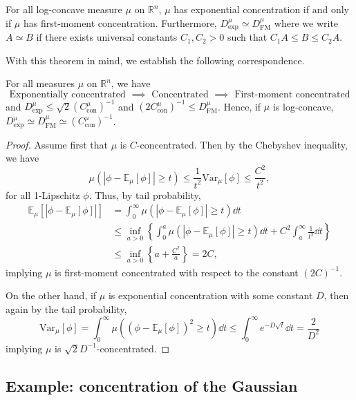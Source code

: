 \begin{theorem}\label{thm:milman}
  For all log-concave measure \(\mu\) on \(\mathbb{R}^n\), \(\mu\) has exponential concentration 
  if and only if \(\mu\) has first-moment concentration. Furthermore, 
  \(D^\mu_{\text{exp}} \simeq D^\mu_{\text{FM}}\) where we write \(A \simeq B\) if there exists 
  universal constants \(C_1, C_2 > 0\) such that \(C_1 A \le B \le C_2 A\).
\end{theorem}

With this theorem in mind, we establish the following correspondence.

\begin{proposition}\label{thm:equiv}
  For all measures \(\mu\) on \(\mathbb{R}^n\), we have 
  \[\text{Exponentially concentrated \(\implies\) Concentrated \(\implies\) First-moment concentrated}\]
  and \(D^\mu_{\text{exp}} \le \sqrt{2} (C^\mu_{\text{con}})^{-1}\) and 
  \((2C^\mu_{\text{con}})^{-1} \le D^\mu_{\text{FM}}\).
  Hence, if \(\mu\) is log-concave, 
  \(D^\mu_{\text{exp}} \simeq D^\mu_{\text{FM}} \simeq (C^\mu_{\text{con}})^{-1}\).
\end{proposition}
\begin{proof}
  Assume first that \(\mu\) is \(C\)-concentrated. Then by the Chebyshev inequality, we have 
  \[\mu(|\phi - \mathbb{E}_\mu[\phi]| \ge t) 
      \le \frac{1}{t^2}\text{Var}_\mu[\phi] 
      \le \frac{C^2}{t^2},\]
  for all 1-Lipschitz \(\phi\). 
  Thus, by tail probability,
  \begin{align*}\mathbb{E}_\mu[|\phi - \mathbb{E}_\mu[\phi]|] 
    & = \int_0^\infty \mu(|\phi - \mathbb{E}_\mu[\phi]| \ge t) \dd t\\ 
    & \le \inf_{a > 0} \left\{\int_0^a \mu(|\phi - \mathbb{E}_\mu[\phi]| \ge t) \dd t + C^2 \int_a^\infty \frac{1}{t^2} \dd t\right\}\\ 
    & \le \inf_{a > 0} \left\{a + \frac{C^2}{a}\right\} = 2C,
  \end{align*}
  implying \(\mu\) is first-moment concentrated with respect to the constant \((2C)^{-1}\).

  On the other hand, if \(\mu\) is exponential concentration with some constant \(D\), then 
  again by the tail probability, 
  \[\text{Var}_\mu[\phi] = \int_0^\infty \mu((\phi - \mathbb{E}_\mu[\phi])^2 \ge t) \dd t
      \le \int_0^\infty e^{-D \sqrt{t}} \dd t = \frac{2}{D^2}\]
  implying \(\mu\) is \(\sqrt{2} D^{-1}\)-concentrated.
\end{proof}

\subsection{Example: concentration of the Gaussian}


